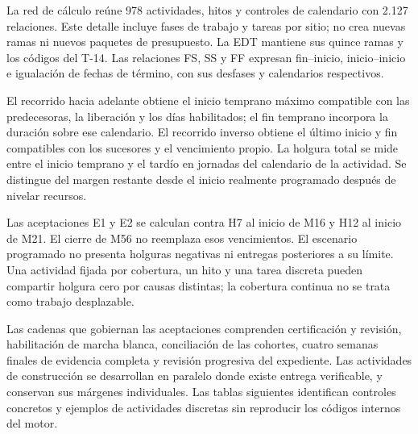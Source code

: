 \documentclass[11pt]{article}
\begin{document}
La red de cálculo reúne 978 actividades, hitos y controles de calendario con 2.127 relaciones. Este detalle incluye fases de trabajo y tareas por sitio; no crea nuevas ramas ni nuevos paquetes de presupuesto. La EDT mantiene sus quince ramas y los códigos del T-14. Las relaciones FS, SS y FF expresan fin--inicio, inicio--inicio e igualación de fechas de término, con sus desfases y calendarios respectivos.

El recorrido hacia adelante obtiene el inicio temprano máximo compatible con las predecesoras, la liberación y los días habilitados; el fin temprano incorpora la duración sobre ese calendario. El recorrido inverso obtiene el último inicio y fin compatibles con los sucesores y el vencimiento propio. La holgura total se mide entre el inicio temprano y el tardío en jornadas del calendario de la actividad. Se distingue del margen restante desde el inicio realmente programado después de nivelar recursos.

Las aceptaciones E1 y E2 se calculan contra H7 al inicio de M16 y H12 al inicio de M21. El cierre de M56 no reemplaza esos vencimientos. El escenario programado no presenta holguras negativas ni entregas posteriores a su límite. Una actividad fijada por cobertura, un hito y una tarea discreta pueden compartir holgura cero por causas distintas; la cobertura continua no se trata como trabajo desplazable.

Las cadenas que gobiernan las aceptaciones comprenden certificación y revisión, habilitación de marcha blanca, conciliación de las cohortes, cuatro semanas finales de evidencia completa y revisión progresiva del expediente. Las actividades de construcción se desarrollan en paralelo donde existe entrega verificable, y conservan sus márgenes individuales. Las tablas siguientes identifican controles concretos y ejemplos de actividades discretas sin reproducir los códigos internos del motor.
\end{document}
